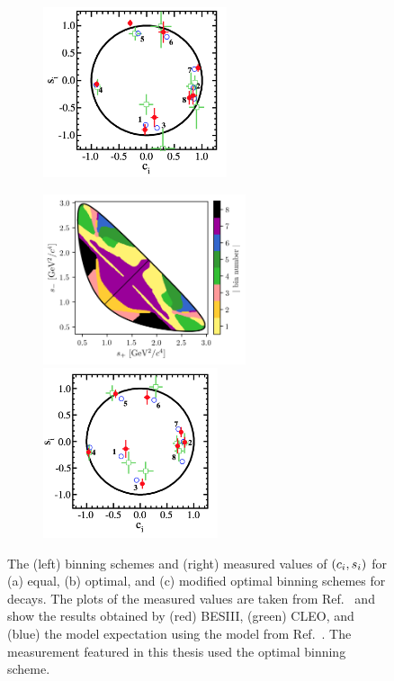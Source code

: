 \begin{figure}[p]
\begin{subfigure}{\columnwidth}
        \includegraphics[height=5cm]{figures/theory/cisi_optimal.png}
        \caption{}
        \label{fig:kspipi_bins_opt}
    \end{subfigure}
    \begin{subfigure}{\columnwidth}
        \centering
        \includegraphics[height=5cm]{figures/theory/binnings/KsPiPi_mod_optimal.png}
        \includegraphics[height=5cm]{figures/theory/cisi_modified_optimal.png}
        \caption{}
        \label{fig:kspipi_bins_modopt}
    \end{subfigure}
    \caption{The (left) binning schemes and (right) measured values of $(c_i,s_i)$ for (a) equal, (b) optimal, and (c) modified optimal binning schemes for \DtoKspipi decays. The plots of the measured values are taken from Ref.~\cite{BESCISI} and show the results obtained by (red) BESIII, (green) CLEO, and (blue) the model expectation using the model from Ref.~\cite{Belle2018}.
    The measurement featured in this thesis used the optimal binning scheme.}
    \label{fig:kspipi_bins}
\end{figure}

